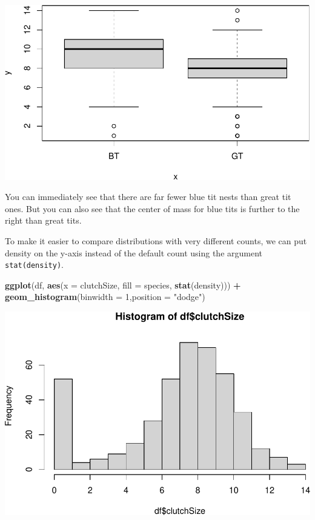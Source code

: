 \documentclass[
  a4paperpaper,
]{book}
\newenvironment{Shaded}{\begin{snugshade}}{\end{snugshade}}
\newcommand{\DataTypeTok}[1]{\textcolor[rgb]{0.13,0.29,0.53}{#1}}
\newcommand{\DecValTok}[1]{\textcolor[rgb]{0.00,0.00,0.81}{#1}}
\newcommand{\KeywordTok}[1]{\textcolor[rgb]{0.13,0.29,0.53}{\textbf{#1}}}
\newcommand{\NormalTok}[1]{#1}
\newcommand{\OperatorTok}[1]{\textcolor[rgb]{0.81,0.36,0.00}{\textbf{#1}}}
\newcommand{\StringTok}[1]{\textcolor[rgb]{0.31,0.60,0.02}{#1}}
\begin{document}
\includegraphics{BB852_files/figure-latex/unnamed-chunk-74-1.pdf}

You can immediately see that there are far fewer blue tit nests than great tit ones. But you can also see that the center of mass for blue tits is further to the right than great tits.

To make it easier to compare distributions with very different counts, we can put density on the y-axis instead of the default count using the argument \texttt{stat(density)}.

\begin{Shaded}
\begin{Highlighting}[]
\KeywordTok{ggplot}\NormalTok{(df, }\KeywordTok{aes}\NormalTok{(}\DataTypeTok{x =}\NormalTok{ clutchSize, }\DataTypeTok{fill =}\NormalTok{ species, }\KeywordTok{stat}\NormalTok{(density))) }\OperatorTok{+}
\StringTok{  }\KeywordTok{geom\_histogram}\NormalTok{(}\DataTypeTok{binwidth =} \DecValTok{1}\NormalTok{,}\DataTypeTok{position =} \StringTok{"dodge"}\NormalTok{)}
\end{Highlighting}
\end{Shaded}

\includegraphics{BB852_files/figure-latex/unnamed-chunk-75-1.pdf}
\end{document}

